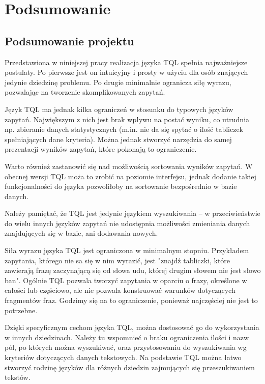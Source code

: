 \chapter*{Podsumowanie}
\section*{Podsumowanie projektu}
Przedstawiona w niniejszej pracy realizacja języka TQL spełnia najważniejsze postulaty. 
Po pierwsze jest on intuicyjny i prosty w użyciu dla osób znających jedynie dziedzinę problemu.
Po drugie minimalnie ogranicza siłę wyrazu, pozwalając na tworzenie skomplikowanych zapytań.

Język TQL ma jednak kilka ograniczeń w stosunku do typowych języków zapytań. 
Największym z nich jest brak wpływu na postać wyniku, co utrudnia np. zbieranie danych statystycznych 
(m.in. nie da się spytać o ilość tabliczek spełniających dane kryteria). 
Można jednak stworzyć narzędzia do samej prezentacji wyników zapytań, które pokonają to ograniczenie. 

Warto również zastanowić się nad możliwością sortowania wyników zapytań. W obecnej wersji TQL moża to zrobić na poziomie interfejsu, jednak
dodanie takiej funkcjonalności do języka pozwoliłoby na sortowanie bezpośrednio w bazie danych.

Należy pamiętać, że TQL jest jedynie językiem wyszukiwania -- w przeciwieństwie do wielu innych języków zapytań
nie udostępnia możliwości zmieniania danych znajdujących się w bazie, ani dodawania nowych. 

Siła wyrazu języka TQL jest ograniczona w minimalnym stopniu.
Przykładem zapytania, którego nie sa się w nim wyrazić, jest
"znajdź tabliczki, które zawierają frazę zaczynającą się od słowa udu, której drugim słowem nie jest słowo ban".
Ogólnie TQL pozwala tworzyć zapytania w oparciu o frazy, określone w całości lub częściowo, ale nie pozwala konstruować warunków
dotyczących fragmentów fraz. Godzimy się na to ograniczenie, ponieważ najczęściej nie jest to potrzebne.





Dzięki specyficznym cechom języka TQL, można dostosować go do wykorzystania w innych dziedzinach. 
Należy tu wspomnieć o braku ograniczenia ilości i nazw pól, po których można wyszukiwać, oraz przystosowaniu 
do wyszukiwania wg kryteriów dotyczących danych tekstowych. 
Na podstawie TQL można łatwo stworzyć rodzinę języków dla różnych dziedzin zajmujących się przeszukiwaniem tekstów.

